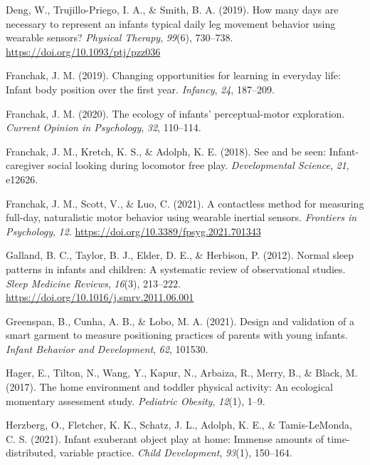 \documentclass[
  man]{apa6}
\newlength{\cslhangindent}
\newlength{\cslentryspacingunit} %
\newenvironment{CSLReferences}[2] %
 {%
  \setlength{\parindent}{0pt}
  \ifodd #1
  \let\oldpar\par
  \def\par{\hangindent=\cslhangindent\oldpar}
  \fi
  \setlength{\parskip}{#2\cslentryspacingunit}
 }%
 {}
\begin{document}
\begin{CSLReferences}{1}{0}
\leavevmode{}%
Deng, W., Trujillo-Priego, I. A., \& Smith, B. A. (2019). How many days are necessary to represent an infant{\textquotesingle}s typical daily leg movement behavior using wearable sensors? \emph{Physical Therapy}, \emph{99}(6), 730--738. \url{https://doi.org/10.1093/ptj/pzz036}

\leavevmode{}%
Franchak, J. M. (2019). Changing opportunities for learning in everyday life: Infant body position over the first year. \emph{Infancy}, \emph{24}, 187--209.

\leavevmode{}%
Franchak, J. M. (2020). The ecology of infants' perceptual-motor exploration. \emph{Current Opinion in Psychology}, \emph{32}, 110--114.

\leavevmode{}%
Franchak, J. M., Kretch, K. S., \& Adolph, K. E. (2018). See and be seen: Infant-caregiver social looking during locomotor free play. \emph{Developmental Science}, \emph{21}, e12626.

\leavevmode{}%
Franchak, J. M., Scott, V., \& Luo, C. (2021). A contactless method for measuring full-day, naturalistic motor behavior using wearable inertial sensors. \emph{Frontiers in Psychology}, \emph{12}. \url{https://doi.org/10.3389/fpsyg.2021.701343}

\leavevmode{}%
Galland, B. C., Taylor, B. J., Elder, D. E., \& Herbison, P. (2012). Normal sleep patterns in infants and children: A systematic review of observational studies. \emph{Sleep Medicine Reviews}, \emph{16}(3), 213--222. \url{https://doi.org/10.1016/j.smrv.2011.06.001}

\leavevmode{}%
Greenspan, B., Cunha, A. B., \& Lobo, M. A. (2021). Design and validation of a smart garment to measure positioning practices of parents with young infants. \emph{Infant Behavior and Development}, \emph{62}, 101530.

\leavevmode{}%
Hager, E., Tilton, N., Wang, Y., Kapur, N., Arbaiza, R., Merry, B., \& Black, M. (2017). The home environment and toddler physical activity: An ecological momentary assessment study. \emph{Pediatric Obesity}, \emph{12}(1), 1--9.

\leavevmode{}%
Herzberg, O., Fletcher, K. K., Schatz, J. L., Adolph, K. E., \& Tamis-LeMonda, C. S. (2021). Infant exuberant object play at home: Immense amounts of time-distributed, variable practice. \emph{Child Development}, \emph{93}(1), 150--164.


\end{CSLReferences}
\end{document}

